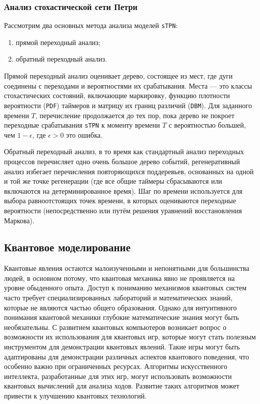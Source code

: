 \subsubsection{Анализ стохастической сети Петри}
Рассмотрим два основных метода анализа моделей \texttt{sTPN}:

\begin{enumerate}
	\item прямой переходный анализ;
	
	\item обратный переходный анализ.
\end{enumerate}

Прямой переходный анализ\cite{transient} оценивает дерево, состоящее из мест, где дуги соединены с переходами и вероятностями их срабатывания. Места — это классы стохастических состояний\cite{dadaya}, включающие маркировку, функцию плотности вероятности (\texttt{PDF}) таймеров и матрицу их границ различий (\texttt{DBM}). Для заданного времени $T$, перечисление продолжается до тех пор, пока дерево не покроет переходные срабатывания \texttt{sTPN} к моменту времени $T$ с вероятностью большей, чем $1-\epsilon$, где $\epsilon > 0$ это ошибка.

Обратный переходный анализ, в то время как стандартный анализ переходных процессов перечисляет одно очень большое дерево событий, регенеративный анализ избегает перечисления повторяющихся поддеревьев, основанных на одной и той же точке регенерации (где все общие таймеры сбрасываются или включаются на детерминированное время). Шаг по времени используется для выбора равноотстоящих точек времени, в которых оцениваются переходные вероятности (непосредственно или путём решения уравнений восстановления Маркова).

\subsection{Квантовое моделирование}

Квантовые явления остаются малоизученными и непонятными для большинства людей, в основном потому, что квантовая механика явно не проявляется на уровне обыденного опыта. Доступ к пониманию механизмов квантовых систем часто требует специализированных лабораторий и математических знаний, которые не являются частью общего образования. Однако для интуитивного понимания квантовой механики глубокие математические знания могут быть необязательны. С развитием квантовых компьютеров возникает вопрос о возможности их использования для квантовых игр\cite{quantum-games}, которые могут стать полезным инструментом для демонстрации квантовых явлений\cite{quantum-theory}. Такие игры могут быть адаптированы для демонстрации различных аспектов квантового поведения, что особенно важно при ограниченных ресурсах. Алгоритмы искусственного интеллекта, разработанные для этих игр, могут использовать возможности квантовых вычислений для анализа ходов\cite{quantum-discrete}. Развитие таких алгоритмов может привести к улучшению квантовых технологий\cite{quantum-discrete2}.

